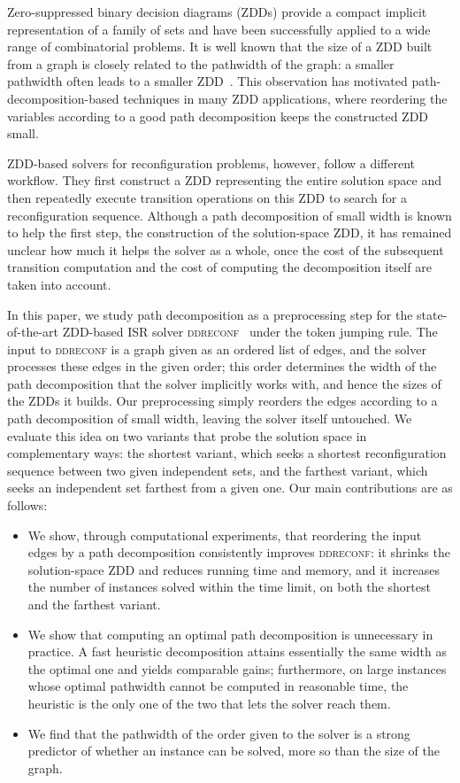 \documentclass[conference]{IEEEtran}
\begin{document}
Zero-suppressed binary decision diagrams (ZDDs) provide a compact implicit
representation of a family of sets and have been successfully applied to a wide
range of combinatorial problems.
It is well known that the size of a ZDD built from a graph is closely related to
the pathwidth of the graph: a smaller pathwidth often leads to a smaller
ZDD~\cite{inoue16}.
This observation has motivated path-decomposition-based techniques in many ZDD
applications, where reordering the variables according to a good path
decomposition keeps the constructed ZDD small.

ZDD-based solvers for reconfiguration problems, however, follow a different
workflow.
They first construct a ZDD representing the entire solution space and then
repeatedly execute transition operations on this ZDD to search for a
reconfiguration sequence.
Although a path decomposition of small width is known to help the first step,
the construction of the solution-space ZDD, it has remained unclear how much it
helps the solver as a whole, once the cost of the subsequent transition
computation and the cost of computing the decomposition itself are taken into
account.

In this paper, we study path decomposition as a preprocessing step for the
state-of-the-art ZDD-based ISR solver \textsc{ddreconf}~\cite{ItoKNSSTT23} under
the token jumping rule.
The input to \textsc{ddreconf} is a graph given as an ordered list of edges, and
the solver processes these edges in the given order; this order determines the
width of the path decomposition that the solver implicitly works with, and hence
the sizes of the ZDDs it builds.
Our preprocessing simply reorders the edges according to a path decomposition of
small width, leaving the solver itself untouched.
We evaluate this idea on two variants that probe the solution space in
complementary ways: the shortest variant, which seeks a shortest reconfiguration
sequence between two given independent sets, and the farthest variant, which
seeks an independent set farthest from a given one.
Our main contributions are as follows:
\begin{itemize}
\item We show, through computational experiments, that reordering the input edges
by a path decomposition consistently improves \textsc{ddreconf}: it shrinks the
solution-space ZDD and reduces running time and memory, and it increases the
number of instances solved within the time limit, on both the shortest and the
farthest variant.
\item We show that computing an optimal path decomposition is unnecessary in
practice. A fast heuristic decomposition attains essentially the same width as
the optimal one and yields comparable gains; furthermore, on large instances
whose optimal pathwidth cannot be computed in reasonable time, the heuristic is
the only one of the two that lets the solver reach them.
\item We find that the pathwidth of the order given to the solver is a strong
predictor of whether an instance can be solved, more so than the size of the
graph.
\end{itemize}
\end{document}
